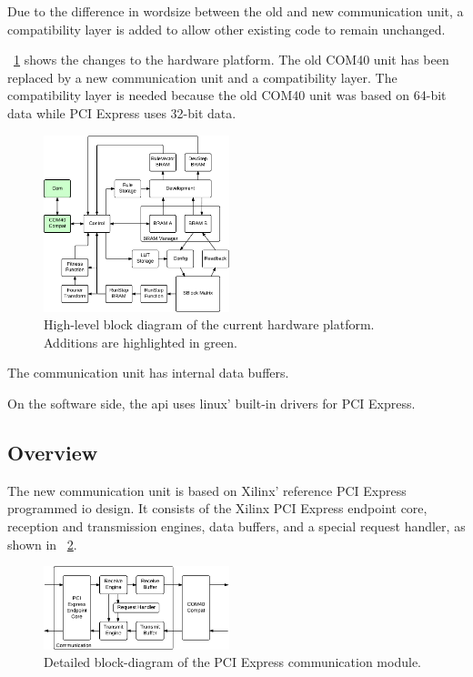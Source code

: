 
Due to the difference in wordsize between the old and new communication unit, a compatibility layer is added to allow other existing code to remain unchanged.

\figurename~\ref{fig:overview-lundal} shows the changes to the hardware platform.
The old COM40 unit has been replaced by a new communication unit and a compatibility layer.
The compatibility layer is needed because the old COM40 unit was based on 64-bit data while PCI Express uses 32-bit data.

\begin{figure}[!ht]
    \centering
    \includegraphics[width=0.48\textwidth]{figures/overview-lundal}
    \caption{High-level block diagram of the current hardware platform. Additions are highlighted in green.}
    \label{fig:overview-lundal}
\end{figure}

The communication unit has internal data buffers.

On the software side, the api uses linux' built-in drivers for PCI Express.

\subsection{Overview}

The new communication unit is based on Xilinx' reference PCI Express programmed io design.
It consists of the Xilinx PCI Express endpoint core, reception and transmission engines, data buffers, and a special request handler, as shown in \figurename~\ref{fig:details-communication}.

\begin{figure}[!ht]
    \centering
    \includegraphics[width=0.48\textwidth]{figures/details-communication}
    \caption{Detailed block-diagram of the PCI Express communication module.}
    \label{fig:details-communication}
\end{figure}

